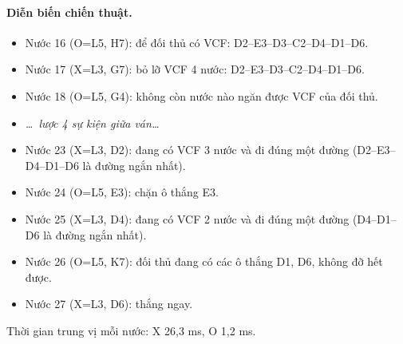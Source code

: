 \paragraph{Diễn biến chiến thuật.}
\begin{itemize}\footnotesize\linespread{1.1}\selectfont
\setlength{\itemsep}{0pt}
  \item Nước 16 (O=L5, H7): để đối thủ có VCF: D2--E3--D3--C2--D4--D1--D6.
  \item Nước 17 (X=L3, G7): bỏ lỡ VCF 4 nước: D2--E3--D3--C2--D4--D1--D6.
  \item Nước 18 (O=L5, G4): không còn nước nào ngăn được VCF của đối thủ.
  \item[] \emph{\dots\ lược 4 sự kiện giữa ván\dots}
  \item Nước 23 (X=L3, D2): đang có VCF 3 nước và đi đúng một đường (D2--E3--D4--D1--D6 là đường ngắn nhất).
  \item Nước 24 (O=L5, E3): chặn ô thắng E3.
  \item Nước 25 (X=L3, D4): đang có VCF 2 nước và đi đúng một đường (D4--D1--D6 là đường ngắn nhất).
  \item Nước 26 (O=L5, K7): đối thủ đang có các ô thắng D1, D6, không đỡ hết được.
  \item Nước 27 (X=L3, D6): thắng ngay.
\end{itemize}
Thời gian trung vị mỗi nước: X 26,3 ms, O 1,2 ms.
\clearpage

